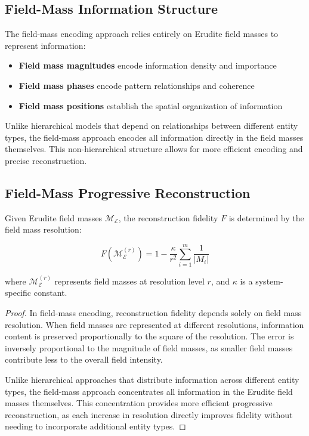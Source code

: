 \subsection{Field-Mass Information Structure}

The field-mass encoding approach relies entirely on Erudite field masses to represent information:

\begin{itemize}
    \item \textbf{Field mass magnitudes} encode information density and importance
    \item \textbf{Field mass phases} encode pattern relationships and coherence
    \item \textbf{Field mass positions} establish the spatial organization of information
\end{itemize}

Unlike hierarchical models that depend on relationships between different entity types, the field-mass approach encodes all information directly in the field masses themselves. This non-hierarchical structure allows for more efficient encoding and precise reconstruction.

\subsection{Field-Mass Progressive Reconstruction}

\begin{proposition}
Given Erudite field masses $\mathcal{M}_\mathcal{E}$, the reconstruction fidelity $F$ is determined by the field mass resolution:

\begin{equation}
F(\mathcal{M}_\mathcal{E}^{(r)}) = 1 - \frac{\kappa}{r^2} \sum_{i=1}^m \frac{1}{|M_i|}
\end{equation}

where $\mathcal{M}_\mathcal{E}^{(r)}$ represents field masses at resolution level $r$, and $\kappa$ is a system-specific constant.
\end{proposition}

\begin{proof}
In field-mass encoding, reconstruction fidelity depends solely on field mass resolution. When field masses are represented at different resolutions, information content is preserved proportionally to the square of the resolution. The error is inversely proportional to the magnitude of field masses, as smaller field masses contribute less to the overall field intensity.

Unlike hierarchical approaches that distribute information across different entity types, the field-mass approach concentrates all information in the Erudite field masses themselves. This concentration provides more efficient progressive reconstruction, as each increase in resolution directly improves fidelity without needing to incorporate additional entity types.
\end{proof}


